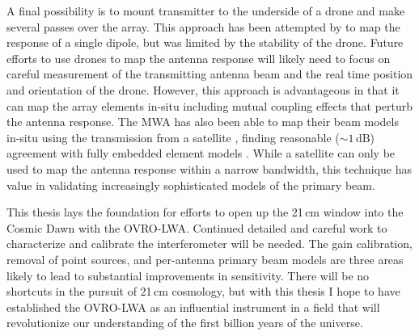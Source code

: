 \begin{bibunit}
A final possibility is to mount transmitter to the underside of a drone and make several passes over
the array. This approach has been attempted by \citet{2017PASP..129c5002J} to map the response of a
single dipole, but was limited by the stability of the drone. Future efforts to use drones to map
the antenna response will likely need to focus on careful measurement of the transmitting antenna
beam and the real time position and orientation of the drone. However, this approach is advantageous
in that it can map the array elements in-situ including mutual coupling effects that perturb the
antenna response.  The MWA has also been able to map their beam models in-situ using the
transmission from a satellite \citep{2018arXiv180804516L}, finding reasonable ($\sim 1\,\text{dB}$)
agreement with fully embedded element models \citep{2017PASA...34...62S}. While a satellite can only
be used to map the antenna response within a narrow bandwidth, this technique has value in
validating increasingly sophisticated models of the primary beam.

This thesis lays the foundation for efforts to open up the 21\,cm window into the Cosmic Dawn with
the OVRO-LWA.  Continued detailed and careful work to characterize and calibrate the interferometer
will be needed. The gain calibration, removal of point sources, and per-antenna primary beam models
are three areas likely to lead to substantial improvements in sensitivity. There will be no
shortcuts in the pursuit of 21\,cm cosmology, but with this thesis I hope to have established the
OVRO-LWA as an influential instrument in a field that will revolutionize our understanding of the
first billion years of the universe.

\end{bibunit}

